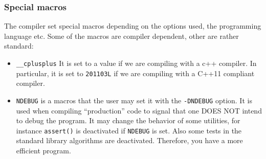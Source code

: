 \documentclass[12pt,aspectratio=169]{beamer}
\begin{document}

\begin{frame}[fragile]
\frametitle{Special macros}
The compiler set special macros depending on the options used, the programming language etc. Some of the macros are compiler dependent, other are rather standard:
\begin{itemize}
\item \texttt{\_\_cplusplus} It is set to a value if we are compiling with a
  c++ compiler. In particular, it is set to \texttt{201103L} if we are
  compiling with a C++11 compliant compiler.
\item \texttt{NDEBUG} is a macros that the user may set it with the \texttt{-DNDEBUG} option. It is
  used when compiling ``production'' code to signal that one {\color{blue}
    DOES NOT} intend to debug the program. It may change the behavior
  of some utilities, for instance \texttt{assert()} is deactivated if
  \texttt{NDEBUG} is set. Also some tests in the standard library algorithms are deactivated. Therefore, you have a more efficient program.
\end{itemize}

\end{frame}
\end{document}
